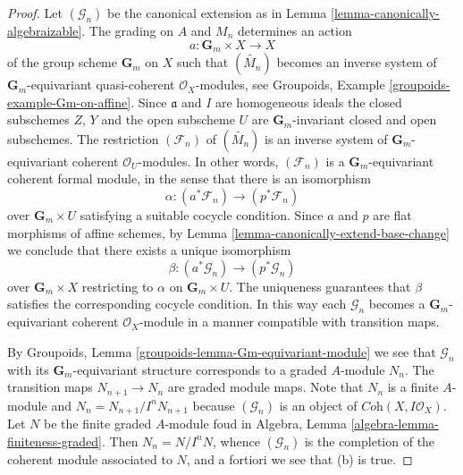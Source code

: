 \begin{proof}
Let $(\mathcal{G}_n)$ be the canonical extension as in
Lemma \ref{lemma-canonically-algebraizable}.
The grading on $A$ and $M_n$ determines an action
$$
a : \mathbf{G}_m \times X \longrightarrow X
$$
of the group scheme $\mathbf{G}_m$ on $X$ such that
$(\widetilde{M_n})$ becomes an inverse system of
$\mathbf{G}_m$-equivariant quasi-coherent $\mathcal{O}_X$-modules, see
Groupoids, Example \ref{groupoids-example-Gm-on-affine}.
Since $\mathfrak a$ and $I$ are homogeneous ideals
the closed subschemes $Z$, $Y$ and the open subscheme $U$
are $\mathbf{G}_m$-invariant closed and open subschemes.
The restriction $(\mathcal{F}_n)$ of $(\widetilde{M_n})$
is an inverse system of $\mathbf{G}_m$-equivariant
coherent $\mathcal{O}_U$-modules. In other words, $(\mathcal{F}_n)$
is a $\mathbf{G}_m$-equivariant coherent formal module,
in the sense that there is an isomorphism
$$
\alpha : (a^*\mathcal{F}_n) \longrightarrow (p^*\mathcal{F}_n)
$$
over $\mathbf{G}_m \times U$ satisfying a suitable cocycle condition.
Since $a$ and $p$ are flat morphisms of affine schemes,
by Lemma \ref{lemma-canonically-extend-base-change}
we conclude that there exists a unique isomorphism
$$
\beta : (a^*\mathcal{G}_n) \longrightarrow (p^*\mathcal{G}_n)
$$
over $\mathbf{G}_m \times X$ restricting to $\alpha$ on
$\mathbf{G}_m \times U$. The uniqueness guarantees that
$\beta$ satisfies the corresponding cocycle condition.
In this way each $\mathcal{G}_n$ becomes
a $\mathbf{G}_m$-equivariant coherent $\mathcal{O}_X$-module
in a manner compatible with transition maps.

\medskip\noindent
By Groupoids, Lemma \ref{groupoids-lemma-Gm-equivariant-module}
we see that $\mathcal{G}_n$ with its $\mathbf{G}_m$-equivariant
structure corresponds to a graded $A$-module $N_n$. The transition maps
$N_{n + 1} \to N_n$ are graded module maps. Note that $N_n$ is a finite
$A$-module and $N_n = N_{n + 1}/I^n N_{n + 1}$ because
$(\mathcal{G}_n)$ is an object of $\textit{Coh}(X, I\mathcal{O}_X)$.
Let $N$ be the finite graded $A$-module foud in
Algebra, Lemma \ref{algebra-lemma-finiteness-graded}.
Then $N_n = N/I^nN$, whence $(\mathcal{G}_n)$
is the completion of the coherent module
associated to $N$, and a fortiori we see that (b) is true.


\end{proof}
